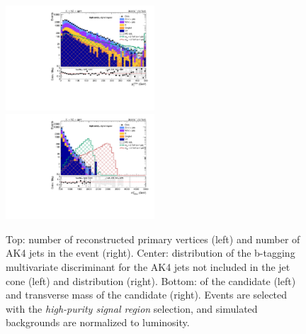 \begin{figure}[!htb]
\begin{center}
    \includegraphics[width=0.495\textwidth]{plots/v9_thesis/XVZnnhpSR/X_pt.pdf}
    \includegraphics[width=0.495\textwidth]{plots/v9_thesis/XVZnnhpSR/X_tmass.pdf}

    \caption{Top: number of reconstructed primary vertices (left) and number of AK4 jets in the event (right). Center: distribution of the b-tagging multivariate discriminant for the AK4 jets not included in the \V jet cone (left) and \MET distribution (right). Bottom: \pt of the \VZ candidate (left) and transverse mass of the \VZ candidate (right). Events are selected with the \emph{high-purity signal region} selection, and simulated backgrounds are normalized to luminosity.}
\label{fig:plot_last}
  \end{center}
\end{figure}




